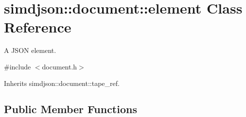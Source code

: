 \hypertarget{classsimdjson_1_1document_1_1element}{}\section{simdjson\+:\+:document\+:\+:element Class Reference}
\label{classsimdjson_1_1document_1_1element}


A J\+S\+ON element.  




{\ttfamily \#include $<$document.\+h$>$}



Inherits simdjson\+::document\+::tape\+\_\+ref.

\subsection*{Public Member Functions}

